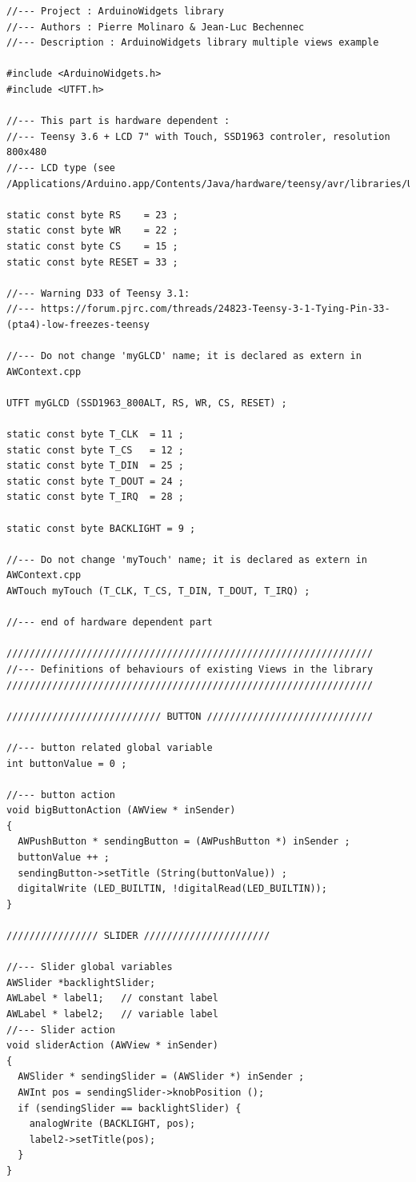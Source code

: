 \documentclass[a4paper,11pt]{extarticle}
\begin{document}
\begin{lstlisting}[language=Arduino]
//--- Project : ArduinoWidgets library
//--- Authors : Pierre Molinaro & Jean-Luc Bechennec
//--- Description : ArduinoWidgets library multiple views example 

#include <ArduinoWidgets.h>
#include <UTFT.h>

//--- This part is hardware dependent :
//--- Teensy 3.6 + LCD 7" with Touch, SSD1963 controler, resolution 800x480
//--- LCD type (see /Applications/Arduino.app/Contents/Java/hardware/teensy/avr/libraries/UTFT/UTFT.h)

static const byte RS    = 23 ;
static const byte WR    = 22 ;
static const byte CS    = 15 ;
static const byte RESET = 33 ;

//--- Warning D33 of Teensy 3.1: 
//--- https://forum.pjrc.com/threads/24823-Teensy-3-1-Tying-Pin-33-(pta4)-low-freezes-teensy

//--- Do not change 'myGLCD' name; it is declared as extern in AWContext.cpp

UTFT myGLCD (SSD1963_800ALT, RS, WR, CS, RESET) ;

static const byte T_CLK  = 11 ;
static const byte T_CS   = 12 ;
static const byte T_DIN  = 25 ;
static const byte T_DOUT = 24 ;
static const byte T_IRQ  = 28 ;

static const byte BACKLIGHT = 9 ;

//--- Do not change 'myTouch' name; it is declared as extern in AWContext.cpp
AWTouch myTouch (T_CLK, T_CS, T_DIN, T_DOUT, T_IRQ) ;

//--- end of hardware dependent part

////////////////////////////////////////////////////////////////
//--- Definitions of behaviours of existing Views in the library
////////////////////////////////////////////////////////////////

/////////////////////////// BUTTON /////////////////////////////

//--- button related global variable
int buttonValue = 0 ;

//--- button action
void bigButtonAction (AWView * inSender)
{
  AWPushButton * sendingButton = (AWPushButton *) inSender ;
  buttonValue ++ ;
  sendingButton->setTitle (String(buttonValue)) ;
  digitalWrite (LED_BUILTIN, !digitalRead(LED_BUILTIN));
}

//////////////// SLIDER //////////////////////

//--- Slider global variables
AWSlider *backlightSlider;
AWLabel * label1;   // constant label
AWLabel * label2;   // variable label
//--- Slider action
void sliderAction (AWView * inSender)
{
  AWSlider * sendingSlider = (AWSlider *) inSender ;
  AWInt pos = sendingSlider->knobPosition ();
  if (sendingSlider == backlightSlider) {
    analogWrite (BACKLIGHT, pos);
    label2->setTitle(pos);
  }
}


\end{lstlisting}
\end{document}
